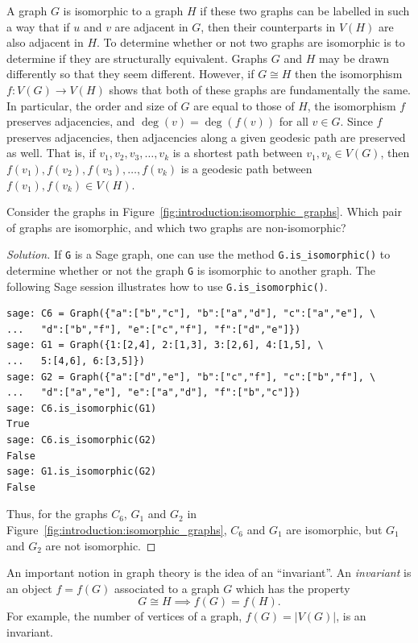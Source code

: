 A graph $G$ is isomorphic to a graph $H$ if these two graphs can be
labelled in such a way that if $u$ and $v$ are adjacent in $G$, then
their counterparts in $V(H)$ are also adjacent in $H$. To determine
whether or not two graphs are isomorphic is to determine if they are
structurally equivalent. Graphs $G$ and $H$ may be drawn differently
so that they seem different. However, if $G \cong H$ then the
isomorphism $f: V(G) \longrightarrow V(H)$ shows that both of these
graphs are fundamentally the same. In particular, the order and size
of $G$ are equal to those of $H$, the isomorphism $f$ preserves
adjacencies, and $\deg(v) = \deg(f(v))$ for all $v \in G$. Since $f$
preserves adjacencies, then adjacencies along a given geodesic path
are preserved as well. That is, if $v_1, v_2, v_3, \dots, v_k$ is a
shortest path between $v_1, v_k \in V(G)$, then
$f(v_1), f(v_2), f(v_3), \dots, f(v_k)$ is a geodesic path between
$f(v_1), f(v_k) \in V(H)$.

\begin{example}
Consider the graphs in
Figure~\ref{fig:introduction:isomorphic_graphs}. Which pair of graphs
are isomorphic, and which two graphs are non-isomorphic?
\end{example}

\begin{proof}[Solution]
If \verb!G! is a Sage graph, one can use the method
\verb!G.is_isomorphic()! to determine whether or not the graph
\verb!G! is isomorphic to another graph. The following Sage session
illustrates how to use \verb!G.is_isomorphic()!.
%
\begin{lstlisting}
sage: C6 = Graph({"a":["b","c"], "b":["a","d"], "c":["a","e"], \
...   "d":["b","f"], "e":["c","f"], "f":["d","e"]})
sage: G1 = Graph({1:[2,4], 2:[1,3], 3:[2,6], 4:[1,5], \
...   5:[4,6], 6:[3,5]})
sage: G2 = Graph({"a":["d","e"], "b":["c","f"], "c":["b","f"], \
...   "d":["a","e"], "e":["a","d"], "f":["b","c"]})
sage: C6.is_isomorphic(G1)
True
sage: C6.is_isomorphic(G2)
False
sage: G1.is_isomorphic(G2)
False
\end{lstlisting}
%
Thus, for the graphs $C_6$, $G_1$ and $G_2$ in
Figure~\ref{fig:introduction:isomorphic_graphs}, $C_6$ and $G_1$ are
isomorphic, but $G_1$ and $G_2$ are not isomorphic.
\end{proof}

An important notion in graph theory is the idea of an ``invariant''.
An \emph{invariant} is an object $f = f(G)$ associated to a
graph $G$ which has the property
\[
G \cong H \implies f(G) = f(H).
\]
For example, the number of vertices of a graph, $f(G) = |V(G)|$, is an
invariant.
\index{graph invariant}


